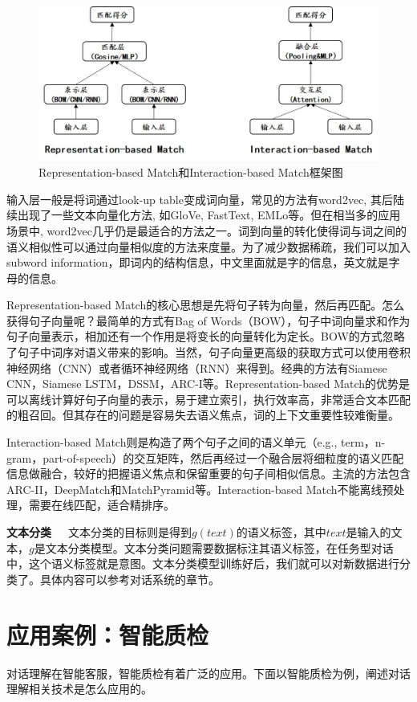 \begin{figure}[ht]
\centering
\includegraphics[scale=0.6]{./img/chapter4_b/representation-interaction.jpg}
\caption{Representation-based Match和Interaction-based Match框架图}
\label{fig1}
\end{figure}
输入层一般是将词通过look-up table变成词向量，常见的方法有word2vec, 其后陆续出现了一些文本向量化方法, 如GloVe, FastText, EMLo等。但在相当多的应用场景中, word2vec几乎仍是最适合的方法之一。词到向量的转化使得词与词之间的语义相似性可以通过向量相似度的方法来度量。为了减少数据稀疏，我们可以加入subword information，即词内的结构信息，中文里面就是字的信息，英文就是字母的信息。

Representation-based Match的核心思想是先将句子转为向量，然后再匹配。怎么获得句子向量呢？最简单的方式有Bag of Words（BOW），句子中词向量求和作为句子向量表示，相加还有一个作用是将变长的向量转化为定长。BOW的方式忽略了句子中词序对语义带来的影响。当然，句子向量更高级的获取方式可以使用卷积神经网络（CNN）或者循环神经网络（RNN）来得到。经典的方法有Siamese CNN，Siamese LSTM，DSSM，ARC-I等。Representation-based Match的优势是可以离线计算好句子向量的表示，易于建立索引，执行效率高，非常适合文本匹配的粗召回。但其存在的问题是容易失去语义焦点，词的上下文重要性较难衡量。

Interaction-based Match则是构造了两个句子之间的语义单元（e.g., term，n-gram，part-of-speech）的交互矩阵，然后再经过一个融合层将细粒度的语义匹配信息做融合，较好的把握语义焦点和保留重要的句子间相似信息。主流的方法包含ARC-II，DeepMatch和MatchPyramid等。Interaction-based Match不能离线预处理，需要在线匹配，适合精排序。

\textbf{文本分类}~~~文本分类的目标则是得到${g(text)}$的语义标签，其中$text$是输入的文本，$g$是文本分类模型。文本分类问题需要数据标注其语义标签，在任务型对话中，这个语义标签就是意图。文本分类模型训练好后，我们就可以对新数据进行分类了。具体内容可以参考对话系统的章节。

\section{应用案例：智能质检}
对话理解在智能客服，智能质检有着广泛的应用。下面以智能质检为例，阐述对话理解相关技术是怎么应用的。
